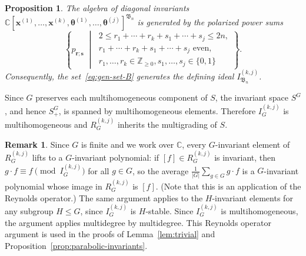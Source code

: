 \documentclass[12pt]{amsart}
\theoremstyle{plain}
\newtheorem{proposition}[theorem]{Proposition}
\theoremstyle{definition}
\newtheorem{remark}[theorem]{Remark}
\newcommand{\Z}{\mathbb{Z}}
\newcommand{\C}{\mathbb{C}}
\begin{document}
\begin{proposition}\label{prop:Weyl-B_n-bf}
    The algebra of diagonal invariants
    $\C[\bm{x}^{(1)}, \ldots, \bm{x}^{(k)}, \bm{\theta}^{(1)}, \ldots, \bm{\theta}^{(j)}]^{\mathfrak{B}_n}$ is generated by the polarized power sums
    \begin{equation}\label{eq:gen-set-B}
    \left\{ p_{\bm{r};\bm{s}} \;\middle|\; 
    \begin{array}{l}
        2 \leq r_1 + \cdots + r_k +s_1 + \cdots +s_j \leq 2n, \\
        r_1 + \cdots + r_k +s_1 + \cdots +s_j\text{ even}, \\
        r_1,\ldots,r_k \in \Z_{\geq 0}, s_1,\ldots, s_j \in \{0,1\}
    \end{array}
    \right\}.
    \end{equation}
    Consequently, the set~\eqref{eq:gen-set-B} generates the defining ideal $I_{\mathfrak{B}_n}^{(k,j)}$.
\end{proposition}

Since $G$ preserves each multihomogeneous component of $S$, the invariant space $S^G$, and hence $S_+^G$, is spanned by multihomogeneous elements. 
Therefore $I_G^{(k,j)}$ is multihomogeneous and $R_G^{(k,j)}$ inherits the multigrading of $S$.

\begin{remark}\label{rem:averaging}
    Since $G$ is finite and we work over $\C$, every $G$-invariant element of $R_G^{(k,j)}$ lifts to a $G$-invariant polynomial: if $[f] \in R_G^{(k,j)}$ is invariant, then $g \cdot f \equiv f \pmod{I_G^{(k,j)}}$ for all $g \in G$, so the average $\frac{1}{|G|}\sum_{g \in G} g \cdot f$ is a $G$-invariant polynomial whose image in $R_G^{(k,j)}$ is $[f]$.
    (Note that this is an application of the Reynolds operator.)
    The same argument applies to the $H$-invariant elements for any subgroup $H \leq G$, since $I_G^{(k,j)}$ is $H$-stable.
    Since $I_G^{(k,j)}$ is multihomogeneous, the argument applies multidegree by multidegree.
    This Reynolds operator argument is used in the proofs of Lemma~\ref{lem:trivial} and Proposition~\ref{prop:parabolic-invariants}.
\end{remark}
\end{document}
